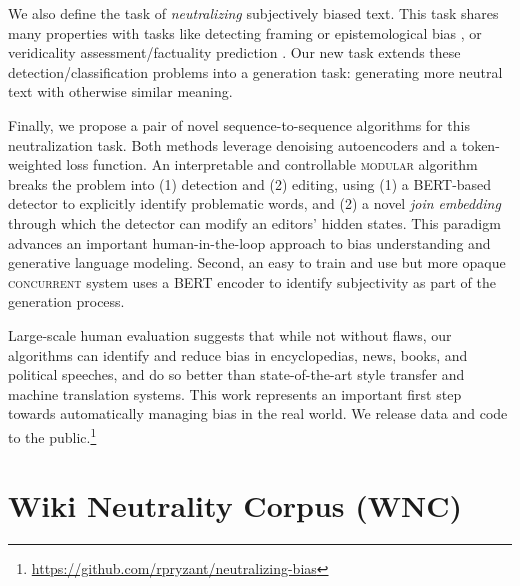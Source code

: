 We also define the task of \textit{neutralizing} subjectively biased text.  This task shares many  properties with tasks like detecting framing or epistemological bias \cite{recasens2013linguistic}, or veridicality assessment/factuality prediction \cite{sauri2009factbank,marneffe12,rudinger18,white18}.  Our new task extends these detection/classification problems into a generation task: generating more neutral text with otherwise similar meaning.

Finally, we propose a pair of novel sequence-to-sequence algorithms for this neutralization task. Both methods leverage denoising autoencoders and a token-weighted loss function. An interpretable and controllable \textsc{modular} algorithm breaks the problem into (1) detection and (2) editing, using (1) a BERT-based detector to explicitly identify problematic words, and (2) a novel \emph{join  embedding} through which the detector can modify an editors' hidden states. This paradigm advances an important human-in-the-loop approach to bias understanding and generative language modeling. 
Second, an easy to train and use but more opaque \textsc{concurrent} system uses a BERT encoder to identify subjectivity as part of the generation process.


 Large-scale human evaluation suggests that while not without flaws, our algorithms can identify and reduce bias in encyclopedias, news, books, and political speeches, and do so better than state-of-the-art style transfer and machine translation systems. This work represents an important first step towards automatically managing bias in the real world. We release data and code to the public.\footnote{\url{https://github.com/rpryzant/neutralizing-bias}}



\section{Wiki Neutrality Corpus (WNC)}
\label{section:corpus}




